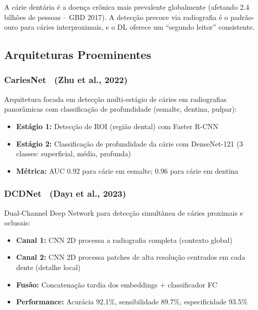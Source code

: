 A cárie dentária é a doença crônica mais prevalente globalmente (afetando 2.4
bilhões de pessoas -- GBD 2017). A detecção precoce via radiografia é o padrão-ouro
para cáries interproximais, e o DL oferece um ``segundo leitor'' consistente.

\subsection{Arquiteturas Proeminentes}

\subsubsection{CariesNet~\cite{zhu2022cariesnet} (Zhu et al., 2022)}

Arquitetura focada em detecção multi-estágio de cáries em radiografias panorâmicas
com classificação de profundidade (esmalte, dentina, pulpar):

\begin{itemize}
  \item \textbf{Estágio 1:} Detecção de ROI (região dental) com Faster R-CNN
  \item \textbf{Estágio 2:} Classificação de profundidade da cárie com
        DenseNet-121 (3 classes: superficial, média, profunda)
  \item \textbf{Métrica:} AUC 0.92 para cárie em esmalte; 0.96 para cárie em dentina
\end{itemize}

\subsubsection{DCDNet~\cite{dayi2023dcdnet} (Dayı et al., 2023)}

Dual-Channel Deep Network para detecção simultânea de cáries proximais e oclusais:

\begin{itemize}
  \item \textbf{Canal 1:} CNN 2D processa a radiografia completa (contexto global)
  \item \textbf{Canal 2:} CNN 2D processa patches de alta resolução centrados
        em cada dente (detalhe local)
  \item \textbf{Fusão:} Concatenação tardia dos embeddings + classificador FC
  \item \textbf{Performance:} Acurácia 92.1\%, sensibilidade 89.7\%, especificidade 93.5\%
\end{itemize}

